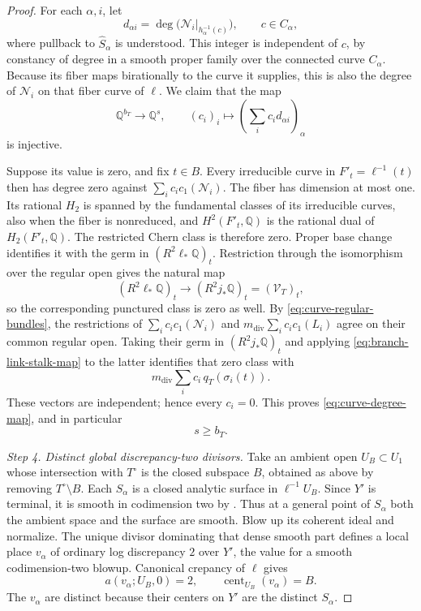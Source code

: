 \documentclass[11pt]{amsart}
\theoremstyle{definition}
\theoremstyle{remark}
\numberwithin{equation}{section}
\newcommand{\Q}{\mathbb{Q}}
\DeclareMathOperator{\cent}{cent}
\begin{document}
\begin{proof}
For each \(\alpha,i\), let
\[
 d_{\alpha i}
 =\deg\bigl(\mathcal N_i|_{h_\alpha^{-1}(c)}\bigr),
 \qquad c\in C_\alpha,
\]
where pullback to \(\widehat S_\alpha\) is understood.  This integer
is independent of \(c\), by constancy of degree in a smooth proper
family over the connected curve \(C_\alpha\).  Because its fiber
maps birationally to the curve it supplies, this is also the degree
of \(\mathcal N_i\) on that fiber curve of \(\ell\).
We claim that the map
\begin{equation}\label{eq:curve-degree-map}
 \Q^{b_T}\longrightarrow\Q^s,\qquad
 (c_i)_i\longmapsto
 \left(\sum_i c_i d_{\alpha i}\right)_\alpha
\end{equation}
is injective.

Suppose its value is zero, and fix \(t\in B\).  Every irreducible
curve in \(F'_t=\ell^{-1}(t)\) then has degree zero against
\(\sum_i c_i c_1(\mathcal N_i)\).  The fiber has dimension at most
one.  Its rational \(H_2\) is spanned by the fundamental classes of
its irreducible curves, also when the fiber is nonreduced, and
\(H^2(F'_t,\Q)\) is the rational dual of \(H_2(F'_t,\Q)\).
The restricted Chern class is therefore zero.  Proper base change
identifies it with the germ in \((R^2\ell_*\Q)_t\).
Restriction through the isomorphism over the regular open gives
the natural map
\[
 (R^2\ell_*\Q)_t\longrightarrow (R^2j_*\Q)_t
     =(\mathcal V_T)_t,
\]
so the corresponding punctured class is zero as well.  By
\eqref{eq:curve-regular-bundles}, the restrictions of
\(\sum_i c_i c_1(\mathcal N_i)\) and
\(m_{\mathrm{div}}\sum_i c_i c_1(L_i)\) agree on their common regular
open.  Taking their germ in \((R^2j_*\Q)_t\) and applying
\eqref{eq:branch-link-stalk-map} to the latter identifies that zero
class with
\[
 m_{\mathrm{div}}\sum_i c_i\,q_T(\sigma_i(t)).
\]
These vectors are independent; hence every \(c_i=0\).  This proves
\eqref{eq:curve-degree-map}, and in particular
\begin{equation}\label{eq:curve-surface-count}
 s\ge b_T.
\end{equation}

\emph{Step 4. Distinct global discrepancy-two divisors.}
Take an ambient open \(U_B\subset U_1\) whose intersection with
\(T^\circ\) is the closed subspace \(B\), obtained as above by
removing \(T^\circ\setminus B\).  Each \(S_\alpha\) is a closed
analytic surface in \(\ell^{-1}U_B\).  Since \(Y'\) is terminal,
it is smooth in codimension two by
\cite[Lemma~2.3]{CanonicalKahler}.  Thus at a general point of
\(S_\alpha\) both the ambient space and the surface are smooth.
Blow up its coherent ideal and normalize.  The unique divisor
dominating that dense smooth part defines a local place \(v_\alpha\)
of ordinary log discrepancy \(2\) over \(Y'\), the value for a
smooth codimension-two blowup.  Canonical crepancy of \(\ell\)
gives
\[
 a(v_\alpha;U_B,0)=2,\qquad
 \cent_{U_B}(v_\alpha)=B.
\]
The \(v_\alpha\) are distinct because their centers on \(Y'\) are
the distinct \(S_\alpha\).


\end{proof}
\end{document}
